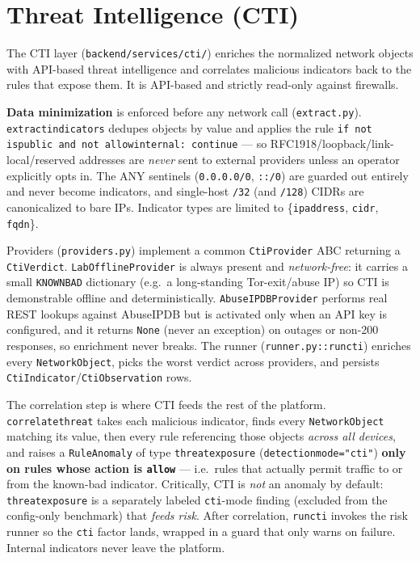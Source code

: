 \documentclass[12pt,a4paper]{report}
\renewcommand{\_}{\textunderscore\allowbreak}
\begin{document}
\section{Threat Intelligence (CTI)}
\label{sec:ch4-cti}

The CTI layer (\texttt{backend/services/cti/}) enriches the normalized network objects with API-based threat intelligence and correlates malicious indicators back to the rules that expose them. It is API-based and strictly read-only against firewalls.

\textbf{Data minimization} is enforced before any network call (\texttt{extract.py}). \texttt{extract\_indicators} dedupes objects by value and applies the rule \texttt{if not is\_public and not allow\_internal: continue} --- so RFC1918/loopback/link-local/reserved addresses are \emph{never} sent to external providers unless an operator explicitly opts in. The ANY sentinels (\texttt{0.0.0.0/0}, \texttt{::/0}) are guarded out entirely and never become indicators, and single-host \texttt{/32} (and \texttt{/128}) CIDRs are canonicalized to bare IPs. Indicator types are limited to \{\texttt{ip\_address}, \texttt{cidr}, \texttt{fqdn}\}.

Providers (\texttt{providers.py}) implement a common \texttt{CtiProvider} ABC returning a \texttt{CtiVerdict}. \texttt{LabOfflineProvider} is always present and \emph{network-free}: it carries a small \texttt{KNOWN\_BAD} dictionary (e.g.\ a long-standing Tor-exit/abuse IP) so CTI is demonstrable offline and deterministically. \texttt{AbuseIPDBProvider} performs real REST lookups against AbuseIPDB but is activated only when an API key is configured, and it returns \texttt{None} (never an exception) on outages or non-200 responses, so enrichment never breaks. The runner (\texttt{runner.py::run\_cti}) enriches every \texttt{NetworkObject}, picks the worst verdict across providers, and persists \texttt{CtiIndicator}/\texttt{CtiObservation} rows.

The correlation step is where CTI feeds the rest of the platform. \texttt{\_correlate\_threat} takes each malicious indicator, finds every \texttt{NetworkObject} matching its value, then every rule referencing those objects \emph{across all devices}, and raises a \texttt{RuleAnomaly} of type \texttt{threat\_exposure} (\texttt{detection\_mode="cti"}) \textbf{only on rules whose action is \texttt{allow}} --- i.e.\ rules that actually permit traffic to or from the known-bad indicator. Critically, CTI is \emph{not} an anomaly by default: \texttt{threat\_exposure} is a separately labeled \texttt{cti}-mode finding (excluded from the config-only benchmark) that \emph{feeds risk}. After correlation, \texttt{run\_cti} invokes the risk runner so the \texttt{cti} factor lands, wrapped in a guard that only warns on failure. Internal indicators never leave the platform.
\end{document}
